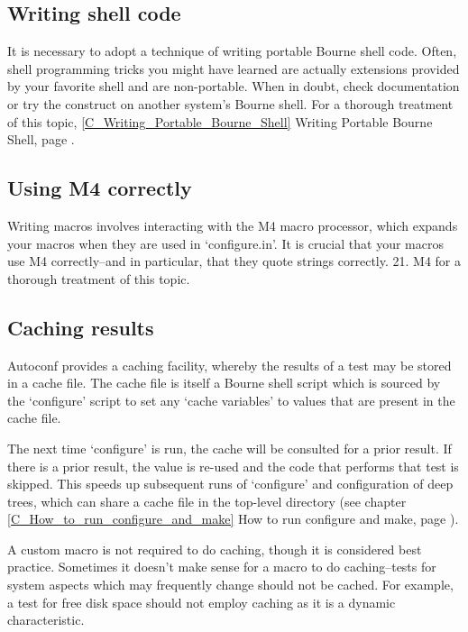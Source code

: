 \subsection{Writing shell code}

It is necessary to adopt a technique of writing portable Bourne shell code. 
Often, shell programming tricks you might have learned are actually extensions 
provided by your favorite shell and are non-portable. When in doubt, check 
documentation or try the construct on another system's Bourne shell. For a 
thorough treatment of this topic, \ref{C_Writing_Portable_Bourne_Shell}
Writing Portable Bourne Shell, page \pageref{C_Writing_Portable_Bourne_Shell}. 

\subsection{Using M4 correctly}

Writing macros involves interacting with the M4 macro processor, which expands your macros when they are used in `configure.in'. It is crucial that your macros use M4 correctly--and in particular, that they quote strings correctly. 21. M4 for a thorough treatment of this topic. 

\subsection{Caching results}

Autoconf provides a caching facility, whereby the results of a test may 
be stored in a cache file. The cache file is itself a Bourne shell script 
which is sourced by the `configure' script to set any `cache variables' to 
values that are present in the cache file.

The next time `configure' is run, the cache will be consulted for a prior 
result. If there is a prior result, the value is re-used and the code that 
performs that test is skipped. This speeds up subsequent runs of `configure' 
and configuration of deep trees, which can share a cache file in the 
top-level directory (see chapter \ref{C_How_to_run_configure_and_make}
How to run configure and make, page \pageref{C_How_to_run_configure_and_make}).

A custom macro is not required to do caching, though it is considered best practice. Sometimes it doesn't make sense for a macro to do caching--tests for system aspects which may frequently change should not be cached. For example, a test for free disk space should not employ caching as it is a dynamic characteristic.

